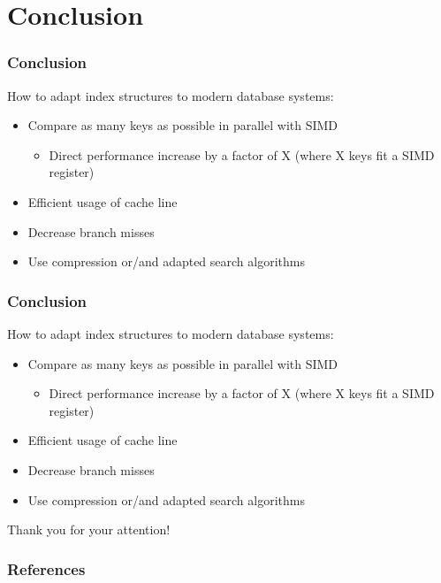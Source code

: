 \documentclass{beamer}
\begin{document}
\begin{frame}


\end{frame}

\section{Conclusion}
\begin{frame}
\frametitle{Conclusion}
How to adapt index structures to modern database systems:
\begin{itemize}[label=\textbullet,leftmargin=2em]
\item Compare as many keys as possible in parallel with SIMD
\begin{itemize}[label=\textbullet,leftmargin=1em]
\item Direct performance increase  by a factor of X (where X keys fit a SIMD register)
\end{itemize}
\item Efficient usage of cache line
\item Decrease branch misses
\item Use compression or/and adapted search algorithms
\end{itemize}
\end{frame}

\begin{frame}
\frametitle{Conclusion}
How to adapt index structures to modern database systems:
\begin{itemize}[label=\textbullet,leftmargin=2em]
\item Compare as many keys as possible in parallel with SIMD
\begin{itemize}[label=\textbullet,leftmargin=1em]
\item Direct performance increase  by a factor of X (where X keys fit a SIMD register)
\end{itemize}
\item Efficient usage of cache line
\item Decrease branch misses
\item Use compression or/and adapted search algorithms
\end{itemize}
\vspace*{\fill}
\begin{center}
\huge Thank you for your attention!
\end{center}
\end{frame}


\begin{frame}
\frametitle{References}


\end{frame}
\end{document}
